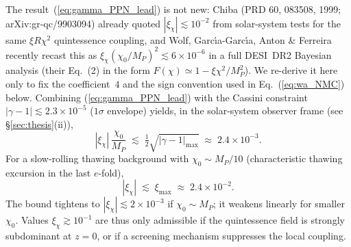 \documentclass[epjc3,twocolumn]{svjour3}
\begin{document}
The result~(\ref{eq:gamma_PPN_lead}) is not new: Chiba (PRD 60, 083508, 1999; arXiv:gr-qc/9903094)
already quoted $|\xi_\chi|\lesssim 10^{-2}$ from solar-system tests for the same $\xi R\chi^{2}$
quintessence coupling, and Wolf, Garc\'{\i}a-Garc\'{\i}a, Anton \& Ferreira~\cite{Wolf2025}
recently recast this as $\xi_\chi(\chi_0/M_P)^{2}\lesssim 6\times 10^{-6}$ in a full DESI~DR2
Bayesian analysis (their Eq.~(2) in the form $F(\chi)\simeq 1-\xi\chi^{2}/M_P^{2}$).
We re-derive it here only to fix the coefficient~$4$ and the sign convention used in
Eq.~(\ref{eq:wa_NMC}) below.
Combining (\ref{eq:gamma_PPN_lead}) with the Cassini constraint~\cite{BertottiIessTortora2003}
$|\gamma-1|\lesssim 2.3\times 10^{-5}$ ($1\sigma$ envelope) yields, in the
solar-system observer frame (see \S\ref{sec:thesis}(ii)),
\begin{equation}
  |\xi_\chi|\,\frac{\chi_0}{M_P}\;\lesssim\;
  \tfrac12\sqrt{|\gamma-1|_{\max}}
  \;\approx\; 2.4\times 10^{-3}.
  \label{eq:xi_bound}
\end{equation}
For a slow-rolling thawing background with $\chi_0\!\sim\! M_P/10$ (characteristic thawing
excursion in the last $e$-fold),
\begin{equation}
  |\xi_\chi|\;\lesssim\;\xi_{\max}\;\approx\;2.4\times 10^{-2}.
  \label{eq:xi_max_numeric}
\end{equation}
The bound tightens to $|\xi_\chi|\lesssim 2\times 10^{-3}$ if $\chi_0\sim M_P$; it weakens
linearly for smaller $\chi_0$. Values $\xi_\chi\gtrsim 10^{-1}$ are thus only admissible if the
quintessence field is strongly subdominant at $z=0$, or if a screening mechanism suppresses the
local coupling.
\end{document}

